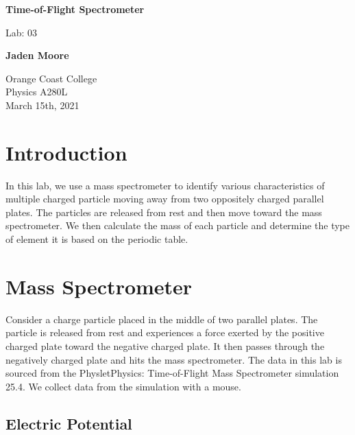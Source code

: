 \documentclass[12pt]{article}
\begin{document}

\begin{titlepage}
    \begin{center}
        \vspace*{1cm}
        \textbf{Time-of-Flight Spectrometer}

        \vspace{0.5cm}
        Lab: 03

        \vspace{1cm}

        \textbf{Jaden Moore}

        \vfill

        Orange Coast College\\
        Physics A280L\\
        March 15th, 2021

    \end{center}
\end{titlepage}

\pagestyle{fancy}
\fancyhf{}
\setlength{\headheight}{15pt}
\cfoot{\thepage}

\section{Introduction}
In this lab, we use a mass spectrometer to identify various characteristics of multiple charged particle moving away from two oppositely charged parallel plates. The particles are released from rest and then move toward the mass spectrometer. We then calculate the mass of each particle and determine the type of element it is based on the periodic table.

\section{Mass Spectrometer}
Consider a charge particle placed in the middle of two parallel plates. The particle is released from rest and experiences a force exerted by the positive charged plate toward the negative charged plate. It then passes through the negatively charged plate and hits the mass spectrometer. The data in this lab is sourced from the Physlet\textregistered \space Physics: Time-of-Flight Mass Spectrometer simulation 25.4. We collect data from the simulation with a mouse.
\subsection{Electric Potential}
\end{document}

